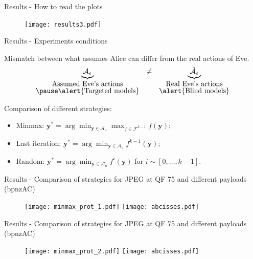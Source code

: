 \documentclass[10pt,aspectratio=169]{beamer}
\newcommand{\fset}{\mathcal{F}}
\begin{document}
\begin{frame}{Results - How to read the plots }
    \begin{figure}
        \texttt{[image: results3.pdf]}
    \end{figure}
\end{frame}

\begin{frame}{Results - Experiments conditions}
    
    Mismatch between what assumes Alice can differ from the real actions of Eve. 
    \begin{equation*}
        \begin{array}{ccc}
            \underbrace{\mathcal{A}_e}_{\mbox{Assumed Eve's actions}} & \neq & \underbrace{\tilde{\mathcal{A}}_e}_{\mbox{Real Eve's actions}} \\
            \pause \alert{\mbox{Targeted models}} & & \alert{\mbox{Blind models}}
        \end{array}
    \end{equation*}
    
    \pause
    Comparison of different strategies: 
    \begin{itemize}
        \item  Minmax: $\mathbf{y}^\ast = \arg \min_{\mathbf{y} \in \mathcal{A}_a} \max_{f \in \fset^{k-1}} f(\mathbf{y})$;
        \item  Last iteration: $\mathbf{y}^\ast = \arg \min_{\mathbf{y} \in \mathcal{A}_a}  f^{k-1}(\mathbf{y})$;
        \item  Random: $\mathbf{y}^\ast = \arg \min_{\mathbf{y} \in \mathcal{A}_a}  f^i(\mathbf{y})$ for $i\sim [0,\dots,k-1]$. 
    \end{itemize}

\end{frame}


\begin{frame}{Results - Comparison of strategies for JPEG at QF 75 and different payloads (bpnzAC)}
    \begin{figure}
        \texttt{[image: minmax\_prot\_1.pdf]}
        \texttt{[image: abcisses.pdf]}
    \end{figure}
\end{frame}

\begin{frame}{Results - Comparison of strategies for JPEG at QF 75 and different payloads (bpnzAC)}
    \begin{figure}
        \texttt{[image: minmax\_prot\_2.pdf]}
        \texttt{[image: abcisses.pdf]}
    \end{figure}
\end{frame}
\end{document}
